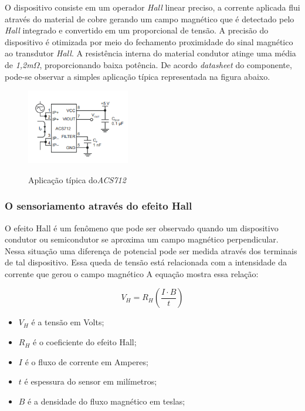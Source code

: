 O dispositivo consiste em um operador \textit{Hall} linear preciso, a corrente aplicada flui através do material de cobre gerando um campo magnético que é detectado pelo \textit{Hall} integrado e convertido em um proporcional de tensão. A precisão do dispositivo é otimizada por meio do fechamento proximidade do sinal magnético ao transdutor \textit{Hall}. A resistência interna do material condutor atinge uma média de \textit{1,2m}$\Omega$, proporcionando baixa potência. De acordo \textit{datasheet} do componente, pode-se observar a simples aplicação típica representada na figura abaixo.
 
\begin{figure}[H]
	\centering
	\caption{Aplicação típica do\textit{ACS712}}
	\includegraphics[width=0.4\textwidth]{figuras/ACS712_typical.png}
	\label{fig:acs712_typical}
\end{figure} 

\subsubsection{O sensoriamento através do efeito Hall}

O efeito Hall é um fenômeno que pode ser observado quando um dispositivo condutor ou semicondutor se aproxima um campo magnético perpendicular. Nessa situação uma diferença de potencial pode ser medida através dos terminais de tal dispositivo. Essa queda de tensão está relacionada com a intensidade da corrente que gerou o campo magnético \cite{ElectronicsTutorials} A equação mostra essa relação: 

\begin{equation}
V_H = R_H\left ( \frac{I\cdot B}{t} \right)
\end{equation}

\begin{itemize}
	
	\item $V_H$ é a tensão em Volts;
	\item $R_H$ é o coeficiente do efeito Hall;
	\item  $I$ é o fluxo de corrente em Amperes;
	\item $t$ é espessura do sensor em milímetros;
	\item $B$ é a densidade do fluxo magnético em teslas; \ \\
\end{itemize}

